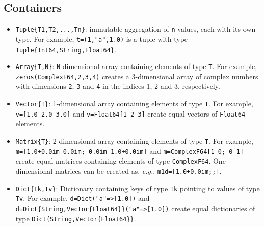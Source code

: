 \documentclass[notitlepage]{article}
\begin{document}
\subsection{Containers}
\begin{itemize}
    \item \texttt{Tuple\{T1,T2,...,Tn\}}: immutable
        aggregation of \texttt{n} values, each with its own
        type. For example, \texttt{t=(1,"a",1.0)} is a tuple
        with type \texttt{Tuple\{Int64,String,Float64\}}.
    \item \texttt{Array\{T,N\}}: \texttt{N}-dimensional array 
        containing elements of type \texttt{T}. For example, 
        \texttt{zeros(ComplexF64,2,3,4)} creates a 3-dimensional
        array of complex numbers with dimensions \texttt{2},
        \texttt{3} and \texttt{4} in the indices 1, 2 and 3,
        respectively.
    \item \texttt{Vector\{T\}}: 1-dimensional array containing
        elements of type \texttt{T}. For example,
        \texttt{v=[1.0 2.0 3.0]} and \texttt{v=Float64[1 2 3]}
        create equal vectors of \texttt{Float64} elements.
    \item \texttt{Matrix\{T\}}: 2-dimensional array containing
        elements of type \texttt{T}. For example,
        \texttt{m=[1.0+0.0im 0.0im; 0.0im 1.0+0.0im]} and
        \texttt{m=ComplexF64[1 0; 0 1]} create equal
        matrices containing elements of type
        \texttt{ComplexF64}. One-dimensional matrices can be
        created as, \textit{e.g.},
        \texttt{m1d=[1.0+0.0im;;]}.
    \item \texttt{Dict\{Tk,Tv\}}: Dictionary containing keys
        of type \texttt{Tk} pointing to values of type
        \texttt{Tv}. For example, \texttt{d=Dict("a"=>[1.0])}
        and
        \texttt{d=Dict\{String,Vector\{Float64\}\}("a"=>[1.0])}
        create equal dictionaries of type
        \texttt{Dict\{String,Vector\{Float64\}\}}.
\end{itemize}
\end{document}

